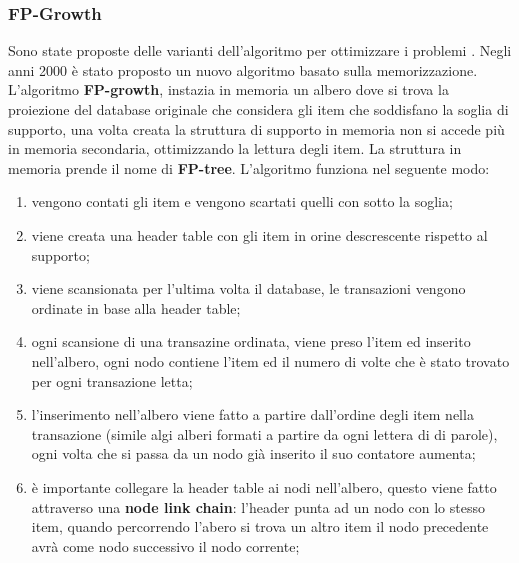 \documentclass[12pt]{article}
\begin{document}
\subsubsection{FP-Growth}
Sono state proposte delle varianti dell'algoritmo per ottimizzare i problemi . Negli anni 2000 \`e stato proposto un nuovo algoritmo basato sulla memorizzazione. L'algoritmo \textbf{FP-growth}, instazia in memoria un albero dove si trova la proiezione del database originale che considera gli item che soddisfano la soglia di supporto, una volta creata la struttura di supporto in memoria non si accede pi\`u in memoria secondaria, ottimizzando la lettura degli item. La struttura in memoria prende il nome di \textbf{FP-tree}. L'algoritmo funziona nel seguente modo:
\begin{enumerate}
    \item vengono contati gli item e vengono scartati quelli con sotto la soglia;
    \item viene creata una header table con gli item in orine descrescente rispetto al supporto;
    \item viene scansionata per l'ultima volta il database, le transazioni vengono ordinate in base alla header table;
    \item ogni scansione di una transazine ordinata, viene preso l'item ed inserito nell'albero, ogni nodo contiene l'item ed il numero di volte che \`e stato trovato per ogni transazione letta;
    \item l'inserimento nell'albero viene fatto a partire dall'ordine degli item nella transazione (simile algi alberi formati a partire da ogni lettera di di parole), ogni volta che si passa da un nodo gi\`a inserito il suo contatore aumenta;
    \item \`e importante collegare la header table ai nodi nell'albero, questo viene fatto attraverso una \textbf{node link chain}: l'header punta ad un nodo con lo stesso item, quando percorrendo l'abero si trova un altro item il nodo precedente avr\`a come nodo successivo il nodo corrente;
\end{enumerate}
\end{document}
